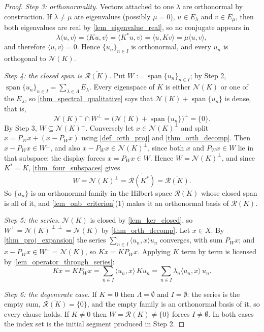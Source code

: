 \documentclass[a4paper]{report}
\theoremstyle{plain}
\theoremstyle{definition}
\theoremstyle{remark}
\begin{document}
\begin{proof}
  \emph{Step 3: orthonormality.}  Vectors attached to one $\lambda$ are orthonormal by
  construction.  If $\lambda \ne \mu$ are eigenvalues (possibly $\mu = 0$),
  $u \in E_\lambda$ and $v \in E_\mu$, then both eigenvalues are real by
  \cref{lem_eigenvalue_real}, so no conjugate appears in
  \[
    \lambda\langle u,v\rangle = \langle Ku,v\rangle = \langle K^*u,v\rangle
      = \langle u,Kv\rangle = \mu\langle u,v\rangle ,
  \]
  and therefore $\langle u,v\rangle = 0$.  Hence $\{u_n\}_{n \in I}$ is orthonormal, and
  every $u_n$ is orthogonal to $\mathcal{N}(K)$.

  \emph{Step 4: the closed span is $\overline{\mathcal{R}(K)}$.}  Put
  $W := \overline{\operatorname{span}}\{u_n\}_{n\in I}$; by Step 2,
  $\operatorname{span}\{u_n\}_{n\in I} = \sum_{\lambda\in\Lambda}E_\lambda$.  Every
  eigenspace of $K$ is either $\mathcal{N}(K)$ or one of the $E_\lambda$, so
  \cref{thm_spectral_qualitative} says that $\mathcal{N}(K)+\operatorname{span}\{u_n\}$ is
  dense, that is,
  \[
    \mathcal{N}(K)^\perp \cap W^\perp
      = \bigl(\mathcal{N}(K) + \operatorname{span}\{u_n\}\bigr)^\perp = \{0\} .
  \]
  By Step 3, $W \subseteq \mathcal{N}(K)^\perp$.  Conversely let
  $x \in \mathcal{N}(K)^\perp$ and split $x = P_Wx + (x-P_Wx)$ using \cref{def_orth_proj}
  and \cref{thm_orth_decomp}.  Then $x-P_Wx \in W^\perp$, and also
  $x-P_Wx \in \mathcal{N}(K)^\perp$, since both $x$ and $P_Wx \in W$ lie in that subspace;
  the display forces $x = P_Wx \in W$.  Hence $W = \mathcal{N}(K)^\perp$, and since
  $K^* = K$, \cref{thm_four_subspaces} gives
  \[
    W = \mathcal{N}(K)^\perp = \overline{\mathcal{R}(K^*)} = \overline{\mathcal{R}(K)} .
  \]
  So $\{u_n\}$ is an orthonormal family in the Hilbert space $\overline{\mathcal{R}(K)}$
  whose closed span is all of it, and \cref{lem_onb_criterion}(1) makes it an orthonormal
  basis of $\overline{\mathcal{R}(K)}$.

  \emph{Step 5: the series.}  $\mathcal{N}(K)$ is closed by \cref{lem_ker_closed}, so
  $W^\perp = \mathcal{N}(K)^{\perp\perp} = \mathcal{N}(K)$ by \cref{thm_orth_decomp}.  Let
  $x \in X$.  By \cref{thm_proj_expansion} the series
  $\sum_{n\in I}\langle u_n,x\rangle u_n$ converges, with sum $P_Wx$; and
  $x - P_Wx \in W^\perp = \mathcal{N}(K)$, so $Kx = KP_Wx$.  Applying $K$ term by term is
  licensed by \cref{lem_operator_through_series}:
  \[
    Kx = KP_Wx = \sum_{n\in I}\langle u_n,x\rangle\,Ku_n
       = \sum_{n\in I}\lambda_n\langle u_n,x\rangle\,u_n .
  \]

  \emph{Step 6: the degenerate case.}  If $K = 0$ then $\Lambda = \emptyset$ and
  $I = \emptyset$: the series is the empty sum, $\overline{\mathcal{R}(K)} = \{0\}$, and
  the empty family is an orthonormal basis of it, so every clause holds.  If $K \ne 0$ then
  $W = \overline{\mathcal{R}(K)} \ne \{0\}$ forces $I \ne \emptyset$.  In both cases the
  index set is the initial segment produced in Step 2.


\end{proof}
\end{document}
